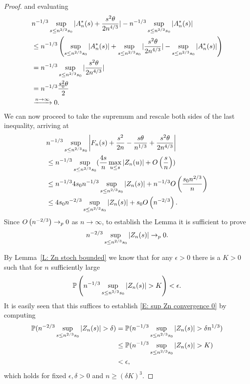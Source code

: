 \begin{proof}
    and evaluating
    \begin{align*}
    &n^{-1 / 3}\sup_{s \leq n^{2 / 3} s_0 } | A^*_n(s) + \frac{s^2\theta}{2n^{4 / 3}}  | - n^{-1 / 3}\sup_{s \leq n^{2 / 3} s_0 } | A^*_n(s) | \\
    &\leq n^{-1 / 3} \left( \sup_{s \leq n^{2 / 3} s_0 } | A^*_n(s) | + \sup_{s \leq n^{2 / 3} s_0 } |\frac{s^2\theta}{2n^{4 / 3}}|  - \sup_{s \leq n^{2 / 3} s_0 } | A^*_n(s) | \right) \\
    &= n^{-1 / 3} \sup_{s \leq n^{2 / 3} s_0 } |\frac{s^2\theta}{2n^{4 / 3}}| \\
    &= n^{-1 / 3} \frac{s_0^2\theta}{2} \\
    &\xrightarrow{n \rightarrow \infty} 0.
    \end{align*}
    We can now proceed to take the supremum and rescale both sides of the last inequality, arriving at
    \begin{equation}
    \begin{aligned}
    &n^{-1 / 3} \sup_{s \leq n^{2 / 3} s_0 } \left| F_n(s) + \frac{s^2}{2n} - \frac{s\theta}{n^{1 / 3}}  + \frac{s^2\theta}{2n^{4 / 3}}  \right| \\
    &\leq n^{-1 / 3} \sup_{s \leq n^{2 / 3} s_0 } (\frac{4s}{n} \max_{u \leq s} |Z_n(u)| + O\left(\frac{s}{n}\right)) \\
    &\leq n^{-1 / 3} 4 s_0 n^{-1 / 3} \sup_{s \leq n^{2 / 3} s_0 } |Z_n(s)| + n^{-1 / 3}O\left(\frac{s_0 n^{2 / 3}}{n}\right) \\
    &\leq 4 s_0 n^{-2 / 3} \sup_{s \leq n^{2 / 3} s_0 } |Z_n(s)| + s_0 O\left(n^{-2 / 3}\right).
    \end{aligned}
    \end{equation}
    Since $O\left(n^{-2 / 3}\right) \rightarrow_p 0$ as $n \rightarrow \infty$, to establish the Lemma it is sufficient to prove
    \begin{equation} \label{E: sup Zn convergence 0}
    n^{-2 / 3} \sup_{s \leq n^{2 / 3} s_0 } |Z_n(s)| \rightarrow_p 0.
    \end{equation}
    
    By Lemma~\ref{L: Zn stoch bounded} we know that for any  $ \epsilon > 0 $  there is a $ K > 0 $
    such that for $n$ sufficiently large 
    \begin{equation} \label{E: stoch bounded}
    \mathbb{P}\left( n^{-1/3} \sup_{s \leq n^{2 / 3} s_0 } |Z_n(s)| > K \right) < \epsilon. 
    \end{equation}
    It is easily seen that this suffices to establish \eqref{E: sup Zn convergence 0} by computing
    \begin{equation*}
    	\begin{aligned}
    		\mathbb{P}( n^{-2 / 3} \sup_{s \leq n^{2 / 3} s_0 } |Z_n(s)| > \delta)
    		&= \mathbb{P}( n^{-1 / 3} \sup_{s \leq n^{2 / 3} s_0 } |Z_n(s)| > \delta n^{1 / 3} ) \\
    		&\leq \mathbb{P}( n^{-1 / 3} \sup_{s \leq n^{2 / 3} s_0 } |Z_n(s)| > K) \\
    		&< \epsilon,
    	\end{aligned}
    \end{equation*}
    which holds for fixed $\epsilon, \delta > 0$ and $n \geq (\delta K)^3$.
\end{proof}

